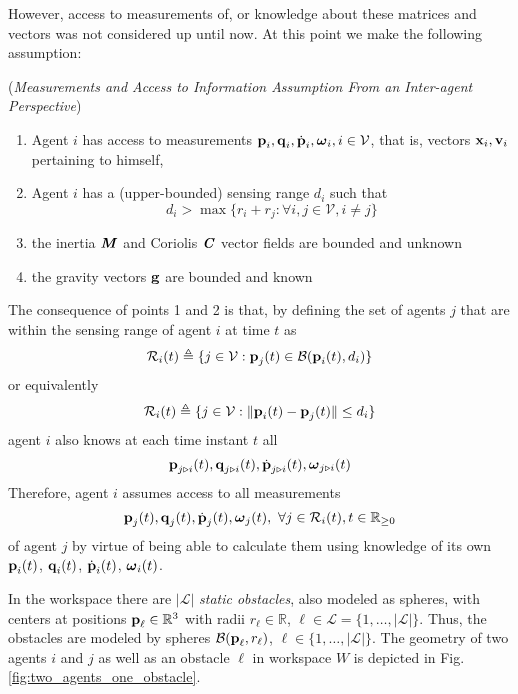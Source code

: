 However, access to measurements of, or knowledge about these matrices and
vectors was not considered up until now. At this point we make the following
assumption:

\begin{gg_box}
  \begin{assumption} (\textit{Measurements and Access to Information Assumption From an
    Inter-agent Perspective})
  \begin{enumerate}

    \item Agent $i$ has access to measurements
      $\bm{\mathbf{p}}_i, \bm{\mathbf{q}}_i, \dot{\bm{\mathbf{p}}}_i, \bm{\mathbf{\omega}}_i, i\in\mathcal{V}$,
      that is, vectors $\bm{\mathbf{x}}_i, \bm{\mathbf{v}}_i$ pertaining to himself,

    \item Agent $i$ has a (upper-bounded) sensing range $d_i$ such that
      $$d_i > \max\{r_i + r_j : \forall i,j \in \mathcal{V}, i \neq j\}$$

    \item the inertia $\bm{\mathit{M}}$ and Coriolis $\bm{\mathit{C}}$ vector fields are
      bounded and unknown

    \item the gravity vectors $\bm{\mathbf{g}}$ are bounded and known

  \end{enumerate}
  \label{ass:measurements_access}
\end{assumption}
\end{gg_box}

The consequence of points 1 and 2 is that, by defining the set of
agents $j$ that are within the sensing range of agent $i$ at time $t$ as
$$\mathcal{R}_i(t) \triangleq \{j\in\mathcal{V} : \bm{\mathbf{p}}_j(t)\in\mathcal{B}(\bm{\mathbf{p}}_i(t), d_i)\}$$
or equivalently
$$\mathcal{R}_i(t) \triangleq \{j\in\mathcal{V} : \| \bm{\mathbf{p}}_i(t) - \bm{\mathbf{p}}_j(t) \| \leq d_i\}$$
agent $i$ also knows at each time instant $t$ all
$$\bm{\mathbf{p}}_{j \triangleright i}(t), \bm{\mathbf{q}}_{j \triangleright i}(t),
\dot{\bm{\mathbf{p}}}_{j \triangleright i}(t), \bm{\mathbf{\omega}}_{j \triangleright i}(t)$$
Therefore, agent $i$ assumes access to all measurements
$$\bm{\mathbf{p}}_{j}(t), \bm{\mathbf{q}}_{j}(t), \dot{\bm{\mathbf{p}}}_j(t),
\bm{\mathbf{\omega}}_j(t),\ \forall j\in \mathcal{R}_i(t),t\in\mathbb{R}_{\geq 0}$$
of agent $j$ by virtue of being able to calculate them using knowledge of its own
$\bm{\mathbf{p}}_i(t)$, $\bm{\mathbf{q}}_i(t)$, $\dot{\bm{\mathbf{p}}}_i(t)$, $\bm{\mathbf{\omega}}_i(t)$.


In the workspace there are $|\mathcal{L}|$ \textit{static obstacles},
also modeled as spheres, with centers at positions
$\bm{\mathbf{p}}_{\ell} \in \mathbb{R}^3$ with radii
$r_{\ell}\in \mathbb{R}$, $\ell \in \mathcal{L} = \{1,\dots,|\mathcal{L}| \}$.
Thus, the obstacles are modeled by spheres
$\mathcal{B}(\bm{\mathbf{p}}_{\ell}, r_{\ell})$, $\ell \in \{1,\dots,|\mathcal{L}|\}$.
The geometry of two agents $i$ and $j$ as well as an obstacle
$\ell$ in workspace $W$ is depicted in Fig. \ref{fig:two_agents_one_obstacle}.\\

